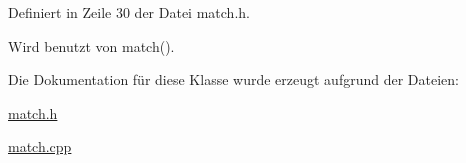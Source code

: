 Definiert in Zeile 30 der Datei match.\-h.



Wird benutzt von match().



Die Dokumentation für diese Klasse wurde erzeugt aufgrund der Dateien\-:\begin{DoxyCompactItemize}
\item 
\hyperlink{match_8h}{match.\-h}\item 
\hyperlink{match_8cpp}{match.\-cpp}\end{DoxyCompactItemize}
